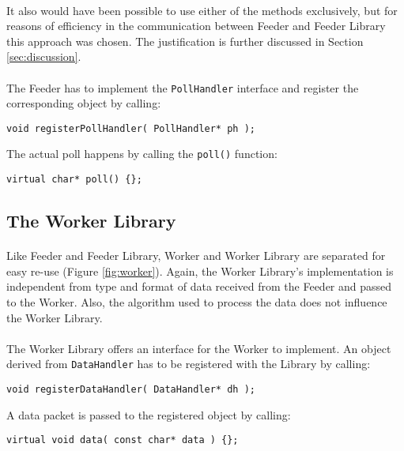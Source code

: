 \paragraph{}
It also would have been possible to use either of the methods exclusively, but for reasons of efficiency in the communication between Feeder and Feeder Library this approach was chosen. The justification is further discussed in Section \ref{sec:discussion}.

\paragraph{}
The Feeder has to implement the \texttt{PollHandler} interface and register the corresponding object by calling:
\begin{flushleft}
\texttt{void registerPollHandler( PollHandler* ph );}
\end{flushleft}
The actual poll happens by calling the \texttt{poll()} function:
\begin{flushleft}
\texttt{virtual char* poll() \{\};}
\end{flushleft}


\subsection{The Worker Library}
\label{sec:workerlib}
\paragraph{}
Like Feeder and Feeder Library, Worker and Worker Library are separated for easy re-use (Figure \ref{fig:worker}). Again, the Worker Library's implementation is independent from type and format of data received from the Feeder and passed to the Worker. Also, the algorithm used to process the data does not influence the Worker Library.

\paragraph{}
The Worker Library offers an interface for the Worker to implement. An object derived from \texttt{DataHandler} has to be registered with the Library by calling:
\begin{flushleft}
\texttt{void registerDataHandler( DataHandler* dh );}
\end{flushleft}
A data packet is passed to the registered object by calling:
\begin{flushleft}
\texttt{virtual void data( const char* data ) \{\};}
\end{flushleft}

